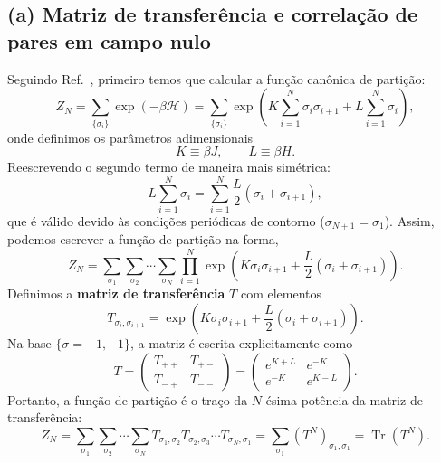 \documentclass[11pt,a4paper]{article}
\begin{document}
\subsection*{(a) Matriz de transferência e correlação de pares em campo nulo}
%
Seguindo Ref.~\cite{salinas}, primeiro temos que calcular a função canônica de partição:
%
\begin{equation}
Z_N = \sum_{\{\sigma_i\}} \exp\left( -\beta \mathcal H \right)
= \sum_{\{\sigma_i\}} \exp\left( K \sum_{i=1}^N \sigma_i\sigma_{i+1} + L \sum_{i=1}^N\sigma_i \right),
\end{equation}
%
onde definimos os parâmetros adimensionais
%
\begin{equation}
K \equiv \beta J, \qquad L \equiv \beta H.
\end{equation}
%
Reescrevendo o segundo termo de maneira mais simétrica:
%
\begin{equation}
L \sum_{i=1}^N \sigma_i
= \sum_{i=1}^N \frac{L}{2}(\sigma_i + \sigma_{i+1}),
\end{equation}
%
que é válido devido às condições periódicas de contorno (\(\sigma_{N+1}=\sigma_1\)). Assim, podemos escrever a função de partição na forma, 
%
\begin{equation}
Z_N = \sum_{\sigma_1} \sum_{\sigma_2} \cdots \sum_{\sigma_N}
\prod_{i=1}^N \exp\left( K \sigma_i\sigma_{i+1} + \frac{L}{2}(\sigma_i + \sigma_{i+1}) \right).
\end{equation}
%
Definimos a \textbf{matriz de transferência} \(T\) com elementos
%
\begin{equation}
T_{\sigma_i, \sigma_{i+1}}
= \exp\left( K \sigma_i\sigma_{i+1} + \frac{L}{2}(\sigma_i + \sigma_{i+1}) \right).
\end{equation}
%
Na base \(\{\sigma = +1, -1\}\), a matriz é escrita explicitamente como
%
\begin{equation}
T =
\begin{pmatrix}
T_{++} & T_{+-} \\
T_{-+} & T_{--}
\end{pmatrix}
=
\begin{pmatrix}
e^{K+L} & e^{-K} \\
e^{-K} & e^{K-L}
\end{pmatrix}.
\label{eq:transfer_matrix}
\end{equation}
%
Portanto, a função de partição é o traço da \(N\)-ésima potência da matriz de transferência:
%
\begin{equation}
Z_N = \sum_{\sigma_1} \sum_{\sigma_2} \cdots \sum_{\sigma_N} T_{\sigma_1,\sigma_2} T_{\sigma_2,\sigma_3} \cdots T_{\sigma_N,\sigma_1}
= \sum_{\sigma_1} \left( T^N \right)_{\sigma_1, \sigma_1}
= \operatorname{Tr}\left( T^N \right).
\end{equation}
\end{document}

